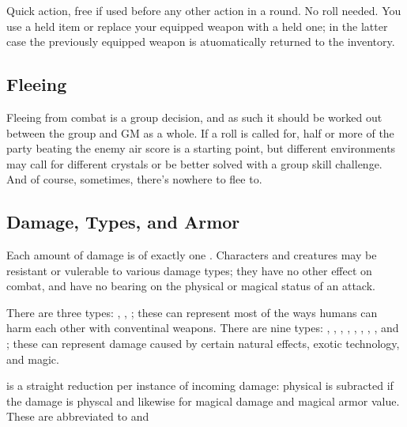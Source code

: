 \begin{multicols}{2}
        \subsubsection{}
            Quick action, free if used before any other action in a round. No roll needed. You use a held item or replace your equipped weapon with a held one; in the latter case the previously equipped weapon is atuomatically returned to the inventory.

    \subsection{Fleeing}
        Fleeing from combat is a group decision, and as such it should be worked out between the group and GM as a whole. If a roll is called for, half or more of the party beating the  enemy air score is a starting point, but different environments may call for different crystals or be better solved with a group skill challenge. And of course, sometimes, there's nowhere to flee to.

    \begin{center}
    \end{center}

    \subsection{Damage, Types, and Armor}
        Each amount of damage is of exactly one . Characters and creatures may be resistant or vulerable to various damage types; they have no other effect on combat, and have no bearing on the physical or magical status of an attack.

        There are three  types: , , ; these can represent most of the ways humans can harm each other with conventinal weapons. There are nine  types: , , , , , , , , and ;  these can represent damage caused by certain natural effects, exotic technology, and magic.

         is a straight reduction per instance of incoming damage: physical  is subracted if the damage is physcal and likewise for magical damage and magical armor value. These are abbreviated to  and 
        \clearpage

\end{multicols}
